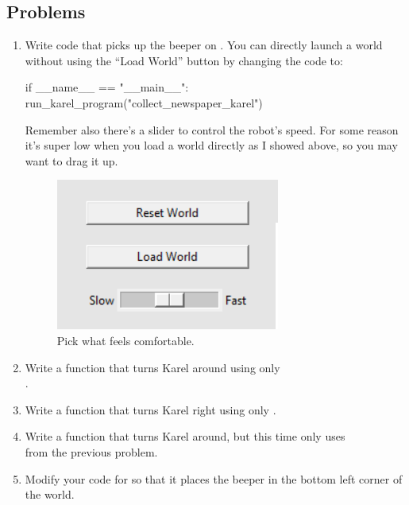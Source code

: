 \documentclass[12pt]{scrartcl}
\begin{document}
\subsection*{Problems}
\begin{enumerate}
    \item Write code that picks up the beeper on . You can directly launch a world without using the ``Load World'' button by changing the code to:
    
    \begin{python}
        if __name__ == "__main__":
            run_karel_program("collect_newspaper_karel")
    \end{python}

    Remember also there's a slider to control the robot's speed. For some reason it's super low when you load a world directly as I showed above, so you may want to drag it up.

    \begin{figure}
        \centering
        \includegraphics[scale=0.5]{SlowFast.png}
        \caption*{Pick what feels comfortable.}
    \end{figure}

    \item Write a function  that turns Karel around using only\\ .
    \item Write a function  that turns Karel right using only .
    \item Write a function  that turns Karel around, but this time only uses\\  from the previous problem.
    \item Modify your code for  so that it places the beeper in the bottom left corner of the world.
\end{enumerate}
\end{document}
